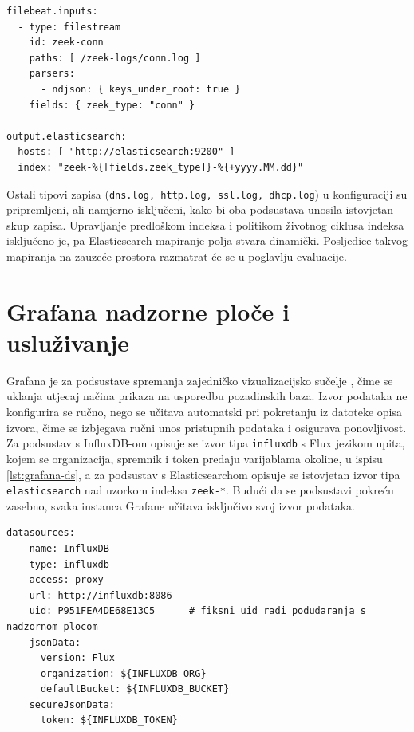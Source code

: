 \begin{lstlisting}[caption={Ulaz i odredišni indeks u \texttt{filebeat.yml}}, label={lst:filebeat-input}]
filebeat.inputs:
  - type: filestream
    id: zeek-conn
    paths: [ /zeek-logs/conn.log ]
    parsers:
      - ndjson: { keys_under_root: true }
    fields: { zeek_type: "conn" }

output.elasticsearch:
  hosts: [ "http://elasticsearch:9200" ]
  index: "zeek-%{[fields.zeek_type]}-%{+yyyy.MM.dd}"
\end{lstlisting}

Ostali tipovi zapisa (\texttt{dns.log, http.log, ssl.log, dhcp.log}) u konfiguraciji su pripremljeni, ali namjerno isključeni, kako bi oba podsustava
unosila istovjetan skup zapisa. Upravljanje predloškom indeksa i politikom životnog ciklusa indeksa  isključeno je, pa Elasticsearch
mapiranje polja stvara dinamički. Posljedice takvog mapiranja na zauzeće prostora razmatrat će se u poglavlju evaluacije.

\section{Grafana nadzorne ploče i usluživanje}

Grafana je za podsustave spremanja zajedničko vizualizacijsko sučelje \cite{grafana_docs}, čime se uklanja utjecaj načina prikaza na usporedbu pozadinskih baza. Izvor podataka ne
konfigurira se ručno, nego se učitava automatski pri pokretanju  iz datoteke opisa izvora, čime se izbjegava ručni unos pristupnih podataka i osigurava
ponovljivost. Za podsustav s InfluxDB-om opisuje se izvor tipa \texttt{influxdb} s Flux jezikom upita, kojem se organizacija, spremnik i token predaju varijablama okoline, u ispisu
\ref{lst:grafana-ds}, a za podsustav s Elasticsearchom opisuje se istovjetan izvor tipa \texttt{elasticsearch} nad uzorkom indeksa \texttt{zeek-*}. Budući da se podsustavi pokreću
zasebno, svaka instanca Grafane učitava isključivo svoj izvor podataka.

\begin{lstlisting}[caption={Automatsko učitavanje InfluxDB izvora podataka}, label={lst:grafana-ds}]
datasources:
  - name: InfluxDB
    type: influxdb
    access: proxy
    url: http://influxdb:8086
    uid: P951FEA4DE68E13C5      # fiksni uid radi podudaranja s nadzornom plocom
    jsonData:
      version: Flux
      organization: ${INFLUXDB_ORG}
      defaultBucket: ${INFLUXDB_BUCKET}
    secureJsonData:
      token: ${INFLUXDB_TOKEN}
\end{lstlisting}

